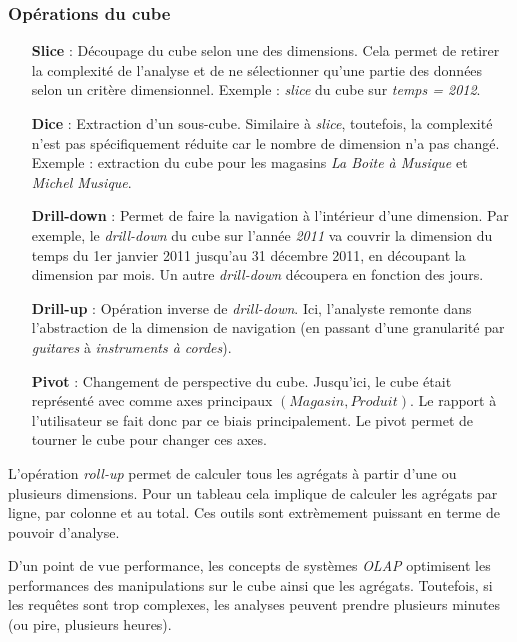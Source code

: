 \subsubsection{Opérations du cube}
\begin{itemize}
	\item[\textbf{Slice}] : Découpage du cube selon une des dimensions. Cela permet de retirer la complexité de l'analyse et de ne sélectionner qu'une partie des données selon un critère dimensionnel. Exemple : \textit{slice} du cube sur \textit{temps = 2012}.
	\item[\textbf{Dice}] : Extraction d'un sous-cube. Similaire à \textit{slice}, toutefois, la complexité n'est pas spécifiquement réduite car le nombre de dimension n'a pas changé. Exemple : extraction du cube pour les magasins \textit{La Boite à Musique} et \textit{Michel Musique}.
	\item[\textbf{Drill-down}] : Permet de faire la navigation à l'intérieur d'une dimension. Par exemple, le \textit{drill-down} du cube sur l'année \textit{2011} va couvrir la dimension du temps du 1er janvier 2011 jusqu'au 31 décembre 2011, en découpant la dimension par mois. Un autre \textit{drill-down} découpera en fonction des jours.
	\item[\textbf{Drill-up}] : Opération inverse de \textit{drill-down}. Ici, l'analyste remonte dans l'abstraction de la dimension de navigation (en passant d'une granularité par \textit{guitares} à \textit{instruments à cordes}).
	\item[\textbf{Pivot}] : Changement de perspective du cube. Jusqu'ici, le cube était représenté avec comme axes principaux $(Magasin, Produit)$. Le rapport à l'utilisateur se fait donc par ce biais principalement. Le pivot permet de tourner le cube pour changer ces axes.
\end{itemize}
L'opération \textit{roll-up} permet de calculer tous les agrégats à partir d'une ou plusieurs dimensions. Pour un tableau cela implique de calculer les agrégats par ligne, par colonne et au total. Ces outils sont extrèmement puissant en terme de pouvoir d'analyse.

D'un point de vue performance, les concepts de systèmes \textit{OLAP} optimisent les performances des manipulations sur le cube ainsi que les agrégats. Toutefois, si les requêtes sont trop complexes, les analyses peuvent prendre plusieurs minutes (ou pire, plusieurs heures).

